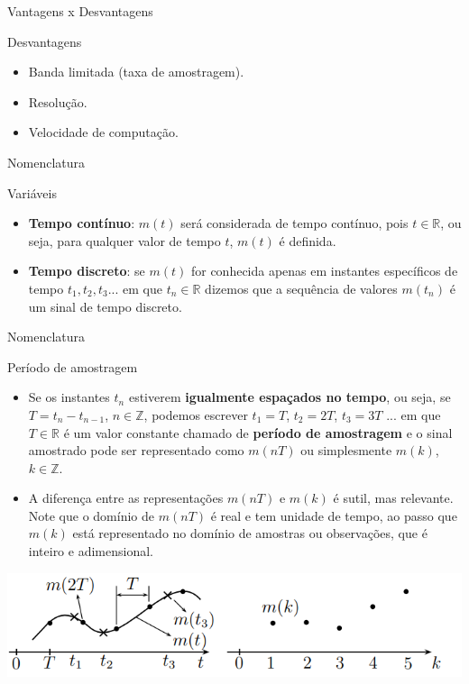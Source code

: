 \begin{frame}{Vantagens x Desvantagens}
\begin{block}{Desvantagens}
\begin{itemize}
	\item Banda limitada (taxa de amostragem).
	\item Resolução.
	\item Velocidade de computação.
\end{itemize}
\end{block}
\end{frame}

\begin{frame}{Nomenclatura}
\begin{block}{Variáveis}
\begin{itemize}
	\item \textbf{Tempo contínuo}: $m(t)$ será considerada de tempo contínuo, pois $t \in \mathbb{R}$, ou seja, para qualquer valor de tempo $t$, $m(t)$ é definida.
	\item \textbf{Tempo discreto}: se $m(t)$ for conhecida apenas em instantes específicos de tempo $t_1, t_2, t_3 ...$ em que $t_n \in \mathbb{R}$ dizemos que a sequência de valores $m(t_n)$ é um sinal de tempo discreto. 
\end{itemize}
\end{block}
\end{frame}

\begin{frame}{Nomenclatura}
\begin{block}{Período de amostragem}
\begin{itemize}
	\item  Se os instantes $t_n$ estiverem \textbf{igualmente espaçados no tempo}, ou seja, se $T = t_n - t_{n-1}$, $n\in \mathbb{Z}$, podemos escrever $t_1 = T$, $t_2 = 2T$, $t_3 = 3T$ ... em que $T \in \mathbb{R}$ é um valor constante chamado de \textbf{período de amostragem} e o sinal amostrado pode ser representado como $m(nT)$ ou simplesmente $m(k)$, $k\in \mathbb{Z}$.
	\item A diferença entre as representações $m(nT)$ e $m(k)$ é sutil, mas relevante. Note que o domínio de $m(nT)$ é real e tem unidade de tempo, ao passo que $m(k)$ está representado no domínio de amostras ou observações, que é inteiro e adimensional.
\end{itemize}
\end{block}
\centerline{\includegraphics[width=0.9\linewidth]{Figuras/Ch01/fig3.PNG}}
\end{frame}

